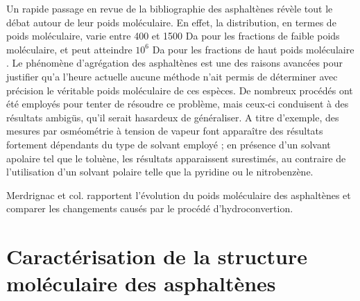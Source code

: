 	Un rapide passage en revue de la bibliographie des asphaltènes révèle tout le débat autour de leur poids moléculaire. En effet, la distribution, en termes de poids moléculaire, varie entre 400 et 1500 Da pour les fractions de faible poids moléculaire, et peut atteindre $10^{6}$ Da pour les fractions de haut poids moléculaire \cite{mullins2008contrasting}. Le phénomène d'agrégation des asphaltènes est une des raisons avancées pour justifier qu'a l'heure actuelle aucune méthode n'ait permis de déterminer avec précision le véritable poids moléculaire de ces espèces. De nombreux procédés ont été employés pour tenter de résoudre ce problème, mais ceux-ci conduisent à des résultats ambigüs, qu'il serait hasardeux de généraliser. A titre d'exemple, des mesures par osméométrie à tension de vapeur font apparaître des résultats fortement dépendants du type de solvant employé ; en présence d'un solvant apolaire tel que le toluène, les résultats apparaissent surestimés, au contraire de l'utilisation d'un solvant polaire telle que la pyridine ou le nitrobenzène. 
	
	
	Merdrignac et col.\cite{merdrignac2006evolution} rapportent l'évolution du poids moléculaire des asphaltènes et comparer les changements causés par le procédé d'hydroconvertion. 
	
	\bigskip
	
	\singlespacing
	\section{Caractérisation de la structure moléculaire des asphaltènes}
	
	
